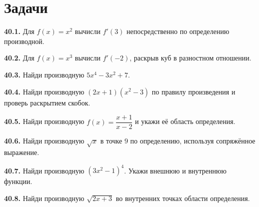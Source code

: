 \section*{Задачи}
\begingroup\setlength{\parskip}{2pt}
\noindent\begin{minipage}[t]{\linewidth}\textbf{40.1.} Для \(f(x)=x^2\) вычисли \(f'(3)\) непосредственно по определению производной.\par\end{minipage}\par
\noindent\begin{minipage}[t]{\linewidth}\textbf{40.2.} Для \(f(x)=x^3\) вычисли \(f'(-2)\), раскрыв куб в разностном отношении.\par\end{minipage}\par
\noindent\begin{minipage}[t]{\linewidth}\textbf{40.3.} Найди производную \(5x^4-3x^2+7\).\par\end{minipage}\par
\noindent\begin{minipage}[t]{\linewidth}\textbf{40.4.} Найди производную \((2x+1)(x^2-3)\) по правилу произведения и проверь раскрытием скобок.\par\end{minipage}\par
\noindent\begin{minipage}[t]{\linewidth}\textbf{40.5.} Найди производную \(f(x)=\dfrac{x+1}{x-2}\) и укажи её область определения.\par\end{minipage}\par
\noindent\begin{minipage}[t]{\linewidth}\textbf{40.6.} Найди производную \(\sqrt x\) в точке \(9\) по определению, используя сопряжённое выражение.\par\end{minipage}\par
\noindent\begin{minipage}[t]{\linewidth}\textbf{40.7.} Найди производную \((3x^2-1)^4\). Укажи внешнюю и внутреннюю функции.\par\end{minipage}\par
\noindent\begin{minipage}[t]{\linewidth}\textbf{40.8.} Найди производную \(\sqrt{2x+3}\) во внутренних точках области определения.\par\end{minipage}\par
